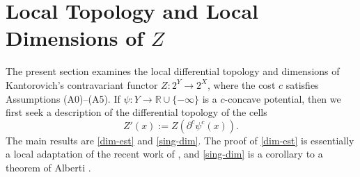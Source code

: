 \documentclass[12pt]{amsart}
\newtheorem{prop}{Proposition}
\theoremstyle{definition}
\theoremstyle{remark}
\newcommand{\bR}{\mathbb{R}}
\newcommand{\del}{\partial}
\begin{document}







\section{Local Topology and Local Dimensions of $Z$}\label{locequations}
The present section examines the local differential topology and dimensions of Kantorovich's contravariant functor $Z: 2^Y \to 2^X$, where the cost $c$ satisfies Assumptions (A0)--(A5). If $\psi:Y\to \bR \cup \{-\infty\}$ is a $c$-concave potential, then we first seek a description of the differential topology of the cells $$Z'(x):=Z(\del^c \psi^c(x)).$$ The main results are \ref{dim-est} and \ref{sing-dim}. The proof of \ref{dim-est} is essentially a local adaptation of the recent work of \cite{KitMc}, and \ref{sing-dim} is a corollary to a theorem of Alberti \cite{Alberti}. %
\end{document}

